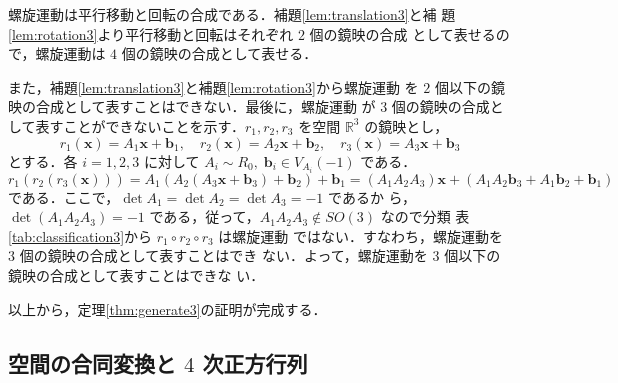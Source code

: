 \documentclass[11pt, uplatex, dvipdfmx, titlepage]{jsarticle}
\makeatletter
\renewenvironment{proof}[1][\proofname]{\par
  \pushQED{\qed}%
  \normalfont \topsep6\p@\@plus6\p@\relax
  \trivlist
  \item[\hskip\labelsep
         \bfseries
    {#1}]\ignorespaces
}{%
  \popQED\endtrivlist\@endpefalse
}
\theoremstyle{definition}
\renewcommand{\proofname}{\textbf{証明}}
\makeatother
\begin{document}
\begin{proof}
  螺旋運動は平行移動と回転の合成である．補題\ref{lem:translation3}と補
  題\ref{lem:rotation3}より平行移動と回転はそれぞれ $2$ 個の鏡映の合成
  として表せるので，螺旋運動は $4$ 個の鏡映の合成として表せる．

  また，補題\ref{lem:translation3}と補題\ref{lem:rotation3}から螺旋運動
  を $2$ 個以下の鏡映の合成として表すことはできない．最後に，螺旋運動
  が $3$ 個の鏡映の合成として表すことができないことを示す．$r_1, r_2,
  r_3$ を空間 $\mathbb{R}^3$ の鏡映とし，
  \[
    r_1(\bm{x}) = A_1 \bm{x} + \bm{b}_1, \quad r_2(\bm{x}) = A_2 \bm{x} + \bm{b}_2, \quad
    r_3(\bm{x}) = A_3 \bm{x} + \bm{b}_3
  \]
  とする．各 $i=1,2,3$ に対して $A_i \sim R_0, \; \bm{b}_i \in V_{A_i}(-1)$ である．
  \[
    r_1 \left( r_2 \left( r_3 \left( \bm{x}\right) \right) \right)
    = A_1 \left( A_2 \left( A_3 \bm{x}+\bm{b}_3\right) + \bm{b}_2\right) + \bm{b}_1
    = \left(A_1 A_2 A_3 \right)\bm{x} + \left(A_1 A_2 \bm{b}_3 + A_1 \bm{b}_2 + \bm{b}_1\right)
  \]
  である．ここで，$\det A_1 = \det A_2 = \det A_3=-1$ であるか
  ら，$\det \left(A_1 A_2 A_3 \right)=-1$
  である，従って，$A_1 A_2 A_3 \notin SO(3)$ なので分類
  表\ref{tab:classification3}から $r_1 \circ r_2 \circ r_3$ は螺旋運動
  ではない．すなわち，螺旋運動を $3$ 個の鏡映の合成として表すことはでき
  ない．よって，螺旋運動を $3$ 個以下の鏡映の合成として表すことはできな
  い．
\end{proof}

以上から，定理\ref{thm:generate3}の証明が完成する．

\subsection{空間の合同変換と $4$ 次正方行列}
\end{document}
